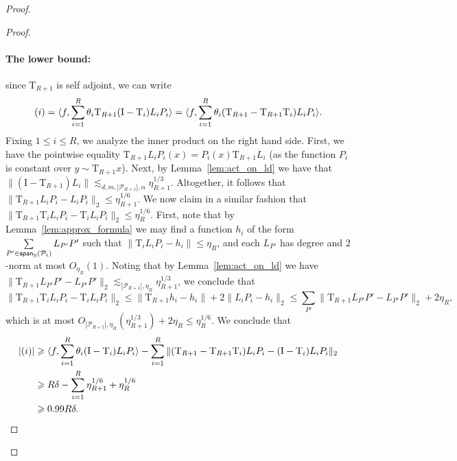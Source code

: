 \documentclass[11pt]{article}
\newcommand\card[1]{\left| {#1} \right|}
\newcommand\norm[1]{\| #1 \|}
\renewcommand{\lll}{\lesssim}
\newcommand\spn{{\sf span}_{\mathbb{N}}}
\newcommand\inner[2]{\langle{#1},{#2}\rangle}
\renewcommand\geq{\geqslant}
\renewcommand\leq{\leqslant}
\newcommand{\rom}[1]{\uppercase\expandafter{\romannumeral #1\relax}}
\begin{document}
\begin{proof}
\begin{proof}
        \paragraph{The lower bound:} since $\mathrm{T}_{R+1}$ is self adjoint, we can write
        \[
        (\rom{1}) = \inner{f}{\sum\limits_{i=1}^{R}\theta_i \mathrm{T}_{R+1}(\mathrm{I}-\mathrm{T}_i)L_i P_i}
        =
        \inner{f}{\sum\limits_{i=1}^{R}\theta_i (\mathrm{T}_{R+1}-\mathrm{T}_{R+1}\mathrm{T}_i)L_i P_i}.
        \]
        Fixing $1\leq i\leq R$, we analyze the inner product on the right hand side. 
        First, we have the pointwise equality $\mathrm{T}_{R+1} L_i P_i(x) = P_i(x)\mathrm{T}_{R+1} L_i$ (as the function $P_i$ is constant over $y\sim \mathrm{T}_{R+1} x$). Next, by Lemma~\ref{lem:act_on_ld} we have that 
        $\norm{(\mathrm{I}-\mathrm{T}_{R+1})L_i}\lll_{d,m,\card{\mathcal{P}_{R+1}},\alpha} \eta_{R+1}^{1/3}$. Altogether, it follows that $\norm{\mathrm{T}_{R+1} L_i P_i - L_i P_i}_2\leq \eta_{R+1}^{1/6}$. 
        We now claim in a similar fashion that 
        $\norm{\mathrm{T}_{R+1}\mathrm{T}_iL_i P_i - \mathrm{T}_iL_i P_i}_2\leq \eta_{R}^{1/6}$. First, note that by Lemma~\ref{lem:approx_formula} we may find a function $h_i$ of the form $\sum\limits_{P'\in \spn(\mathcal{P}_i)}L_{P'}P'$ such that $\norm{\mathrm{T}_iL_i P_i-h_i}\leq \eta_R$, and each $L_{P'}$ has degree and $2$-norm at most $O_{\eta_R}(1)$. Noting that by Lemma~\ref{lem:act_on_ld} we have $\norm{\mathrm{T}_{R+1} L_{P'} P' - L_{P'} P'}_2\lll_{\card{\mathcal{P}_{R+1}},\eta_R} \eta_{R+1}^{1/3}$, we conclude that
        \[
    \norm{\mathrm{T}_{R+1}\mathrm{T}_iL_i P_i - \mathrm{T}_iL_i P_i}_2
    \leq
    \norm{\mathrm{T}_{R+1} h_i - h_i}
    +2\norm{L_iP_i - h_i}_2
    \leq 
    \sum\limits_{P'}\norm{\mathrm{T}_{R+1} L_{P'}P' - L_{P'}P'}_2
    +2\eta_R,
        \]
        which is at most $O_{\card{\mathcal{P}_{R+1}},\eta_R}(\eta_{R+1}^{1/3}) + 2\eta_R\leq \eta_R^{1/6}$. 
        We conclude that 
        \begin{align*}
        \card{(\rom{1})}
        &\geq 
        \inner{f}{\sum\limits_{i=1}^{R}\theta_i (\mathrm{I}-\mathrm{T}_i)L_i P_i}
        -\sum\limits_{i=1}^{R}
        \norm{(\mathrm{T}_{R+1}-\mathrm{T}_{R+1}\mathrm{T}_i)L_i P_i-(\mathrm{I}-\mathrm{T}_i)L_i P_i}_2
        \\
        &\geq 
        R\delta - 
        \sum\limits_{i=1}^{R} \eta_{R+1}^{1/6} + \eta_{R}^{1/6}\\
        &\geq 0.99 R\delta.
        \end{align*}

\end{proof}
\end{proof}
\end{document}
